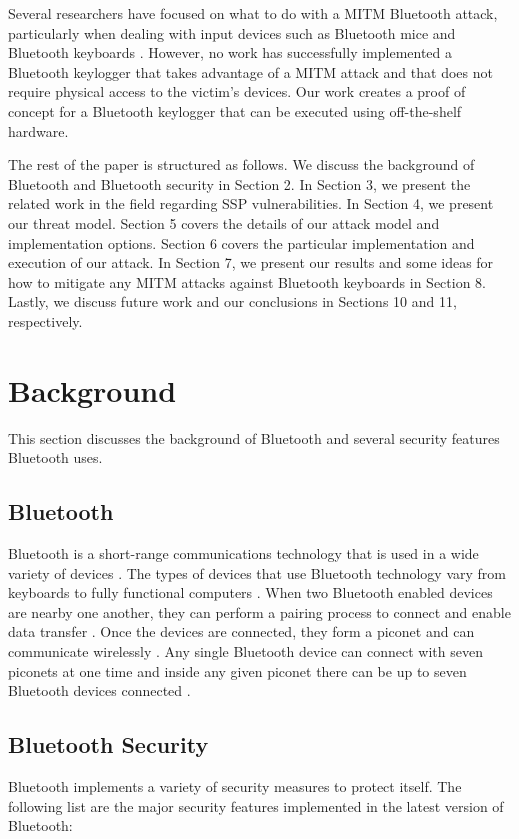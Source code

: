 \documentclass{acm_proc_article-sp}
\begin{document}
Several researchers have focused on what to do with a MITM Bluetooth attack, particularly when dealing with input devices such as Bluetooth mice \cite{btmice} and Bluetooth keyboards \cite{cuthbertbluetooth,ma2007keystroke}. However, no work has successfully implemented a Bluetooth keylogger that takes advantage of a MITM attack and that does not require physical access to the victim's devices. Our work creates a proof of concept for a Bluetooth keylogger that can be executed using off-the-shelf hardware. 

The rest of the paper is structured as follows. We discuss the background of Bluetooth and Bluetooth security in Section 2. In Section 3, we present the related work in the field regarding SSP vulnerabilities. In Section 4, we present our threat model. Section 5 covers the details of our attack model and implementation options. Section 6 covers the particular implementation and execution of our attack. In Section 7, we present our results and some ideas for how to mitigate any MITM attacks against Bluetooth keyboards in Section 8. Lastly, we discuss future work and our conclusions in Sections 10 and 11, respectively.

\section{Background}
This section discusses the background of Bluetooth and several security features Bluetooth uses.

\subsection{Bluetooth}
Bluetooth is a short-range communications technology that is used in a wide variety of devices \cite{bluetooth}. The types of devices that use Bluetooth technology vary from keyboards to fully functional computers \cite{bluetooth}. When two Bluetooth enabled devices are nearby one another, they can perform a pairing process to connect and enable data transfer \cite{bluetooth}. Once the devices are connected, they form a piconet and can communicate wirelessly \cite{bluetooth}. Any single Bluetooth device can connect with seven piconets at one time and inside any given piconet there can be up to seven Bluetooth devices connected \cite{bluetooth}. 

\subsection{Bluetooth Security}
Bluetooth implements a variety of security measures to protect itself. The following list are the major security features implemented in the latest version of Bluetooth:
\end{document}

